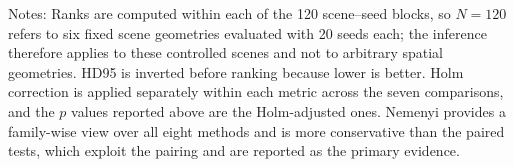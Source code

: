\begin{table}[tbp]
\vspace{2pt}
\noindent\footnotesize{Notes: Ranks are computed within each of the 120 scene--seed blocks, so $N=120$ refers to six fixed scene geometries evaluated with 20 seeds each; the inference therefore applies to these controlled scenes and not to arbitrary spatial geometries. HD95 is inverted before ranking because lower is better. Holm correction is applied separately within each metric across the seven comparisons, and the $p$ values reported above are the Holm-adjusted ones. Nemenyi provides a family-wise view over all eight methods and is more conservative than the paired tests, which exploit the pairing and are reported as the primary evidence.}
\end{table}
